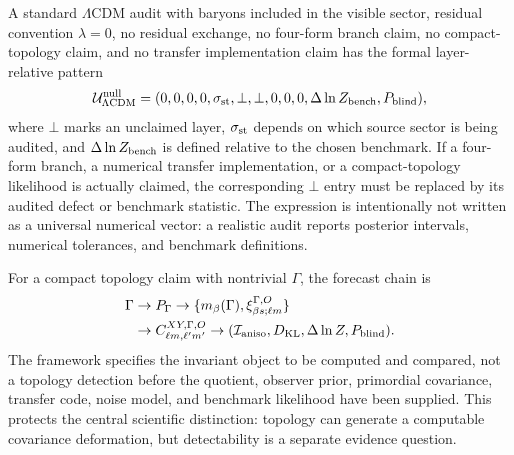 \documentclass[
  aps,
  prd,
  reprint,
  superscriptaddress,
  floatfix,
  nofootinbib,
  longbibliography
]{revtex4-2}
\theoremstyle{plain}
\theoremstyle{definition}
\theoremstyle{remark}
\newcommand{\KL}{\operatorname{KL}}
\newcommand{\PG}{P_{\Gamma}}
\newcommand{\LCDM}{\Lambda\mathrm{CDM}}
\newcommand{\Ical}{\mathcal I}
\newcommand{\Ucal}{\mathcal U}
\begin{document}
A standard $\LCDM$ audit with baryons included in the visible sector, residual convention $\lambda=0$, no residual exchange, no four-form branch claim, no compact-topology claim, and no transfer implementation claim has the formal layer-relative pattern
\begin{equation}
\Ucal_{\LCDM}^{\rm null}=(0,0,0,0,\sigma_{\rm st},\bot,\bot,0,0,0,\Delta\ln Z_{\rm bench},P_{\rm blind}),
\label{eq:lcdm_null_vector}
\end{equation}
where $\bot$ marks an unclaimed layer, $\sigma_{\rm st}$ depends on which source sector is being audited, and $\Delta\ln Z_{\rm bench}$ is defined relative to the chosen benchmark.  If a four-form branch, a numerical transfer implementation, or a compact-topology likelihood is actually claimed, the corresponding $\bot$ entry must be replaced by its audited defect or benchmark statistic.  The expression is intentionally not written as a universal numerical vector: a realistic audit reports posterior intervals, numerical tolerances, and benchmark definitions.

For a compact topology claim with nontrivial $\Gamma$, the forecast chain is
\begin{equation}
\begin{aligned}
\Gamma&\to \PG
\to \{m_\beta(\Gamma),\xi_{\beta s;\ell m}^{\Gamma,O}\}\\
&\to C_{\ell m,\ell'm'}^{XY,\Gamma,O}
\to (\Ical_{\rm aniso},D_{\KL},\Delta\ln Z,P_{\rm blind}).
\end{aligned}
\label{eq:topology_forecast_chain}
\end{equation}
The framework specifies the invariant object to be computed and compared, not a topology detection before the quotient, observer prior, primordial covariance, transfer code, noise model, and benchmark likelihood have been supplied.  This protects the central scientific distinction: topology can generate a computable covariance deformation, but detectability is a separate evidence question.
\end{document}
